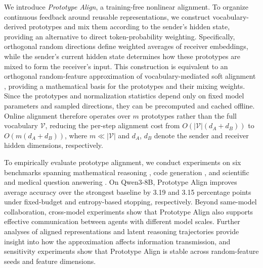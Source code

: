 \documentclass[11pt]{article}
\begin{document}
We introduce \emph{Prototype Align}, a training-free nonlinear alignment. 
To organize continuous feedback around reusable representations, we construct vocabulary-derived prototypes and mix them according to the sender's hidden state, providing an alternative to direct token-probability weighting.
Specifically, orthogonal random directions define weighted averages of receiver embeddings, while the sender's current hidden state determines how these prototypes are mixed to form the receiver's input. This construction is equivalent to an orthogonal random-feature approximation of vocabulary-mediated soft alignment \citep{linear_attentions,performer}, providing a mathematical basis for the prototypes and their mixing weights. Since the prototypes and normalization statistics depend only on fixed model parameters and sampled directions, they can be precomputed and cached offline. Online alignment therefore operates over $m$ prototypes rather than the full vocabulary $\mathcal{V}$, reducing the per-step alignment cost from $O(|\mathcal{V}|(d_A+d_B))$ to $O(m(d_A+d_B))$, where $m\ll|\mathcal{V}|$ and $d_A$, $d_B$ denote the sender and receiver hidden dimensions, respectively.


To empirically evaluate prototype alignment, we conduct experiments on six benchmarks spanning mathematical reasoning \citep{aime2024,aime2025}, code generation \citep{evalplus}, and scientific and medical question answering \citep{gpqa,medqa}. 
On Qwen3-8B, Prototype Align improves average accuracy over the strongest baseline by 3.19 and 3.15 percentage points under fixed-budget and entropy-based stopping, respectively. 
Beyond same-model collaboration, cross-model experiments show that Prototype Align also supports effective communication between agents with different model scales. Further analyses of aligned representations and latent reasoning trajectories provide insight into how the approximation affects information transmission, and sensitivity experiments show that Prototype Align is stable across random-feature seeds and feature dimensions.
\end{document}
